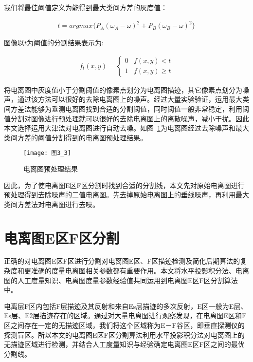 我们将最佳阈值定义为能得到最大类间方差的灰度值：
\begin{linenomath}
\begin{align}
t=argmax\{P_{A}(\omega_{A}-\omega)^2+P_{B}(\omega_{B}-\omega)^{2}\}
\label{式3_7}
\end{align}
\end{linenomath}


图像以$t$为阈值的分割结果表示为:
\begin{linenomath}
\begin{align}
f_t(x, y) = \left\{ \begin{array}{ll}
0 & f(x, y) < t\\
1 & f(x, y) \ge t
\end{array} \right.
\label{式3_8}
\end{align}
\end{linenomath}
           
将电离图中灰度值小于分割阈值的像素点划分为电离图描迹，其它像素点划分为噪声，通过该方法可以很好的去除电离图上的噪声。经过大量实验验证，运用最大类间方差法能够为垂测电离图找到合适的分割阈值，同时阈值一般非常稳定，利用阈值分割对图像进行预处理就可以很好的去除电离图上的离散噪声，减小干扰。因此本文选择运用大津法对电离图进行自动去噪。如图~\ref{图3_3}为电离图经过去除噪声和最大类间方差的阈值分割得到的电离图预处理结果。

\begin{figure}[h]
\centering
\texttt{[image: 图3\_3]}
\caption{电离图预处理结果}
\label{图3_3}    
\end{figure}
 
因此，为了使电离图E区F区分割时找到合适的分割线，本文先对原始电离图进行预处理得到去除噪声的二值电离图。先去掉原始电离图上的垂线噪声，再利用最大类间方差法对电离图进行去噪。 

\section{电离图E区F区分割}
\label{3_3}

正确的对电离图E区F区进行分割对电离图E区、F区描迹检测及简化后期算法的复杂度和更准确的度量电离图相关参数都有重要作用。本文将水平投影积分法、电离图的人工度量知识、电离图度量参数经验值共同运用到电离图E区F区分割算法中。
         
电离层F区内包括F层描迹及其反射和来自Es层描迹的多次反射，E区一般为E层、Es层、E2层描迹存在的区域。通过对大量电离图进行观察发现，在电离图E区和F区之间存在一定的无描迹区域，我们将这个区域称为E－F谷区，即垂直探测仪的探测盲区。所以本文的电离图E区F区分割算法利用水平投影积分法对电离图上的无描迹区域进行检测，并结合人工度量知识与经验确定电离图E区F区之间的最优分割线。
         
